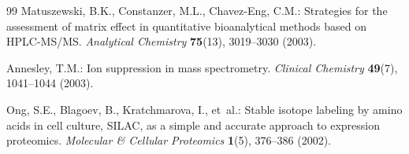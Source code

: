 \documentclass[11pt,twoside,openright]{book}
\begin{document}
\begin{thebibliography}{99}
Matuszewski, B.K., Constanzer, M.L., Chavez-Eng, C.M.:
\newblock Strategies for the assessment of matrix effect in quantitative bioanalytical methods based on {HPLC-MS/MS}.
\newblock \emph{Analytical Chemistry} \textbf{75}(13), 3019--3030 (2003).
\newblock {}

Annesley, T.M.:
\newblock Ion suppression in mass spectrometry.
\newblock \emph{Clinical Chemistry} \textbf{49}(7), 1041--1044 (2003).
\newblock {}

Ong, S.E., Blagoev, B., Kratchmarova, I., et~al.:
\newblock Stable isotope labeling by amino acids in cell culture, {SILAC}, as a simple and accurate approach to expression proteomics.
\newblock \emph{Molecular \& Cellular Proteomics} \textbf{1}(5), 376--386 (2002).
\newblock {}

\end{thebibliography}
\end{document}
